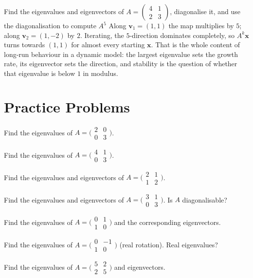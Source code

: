 \begin{worked}{Find the eigenvalues and eigenvectors of $A=\begin{pmatrix}4&1\\2&3\end{pmatrix}$, diagonalise it, and use the diagonalisation to compute $A^{5}$}
Along $\mathbf v_{1}=(1,1)$ the map multiplies by $5$; along
$\mathbf v_{2}=(1,-2)$ by $2$. Iterating, the $5$-direction dominates
completely, so $A^{k}\mathbf x$ turns towards $(1,1)$ for almost every
starting $\mathbf x$. That is the whole content of long-run behaviour in a
dynamic model: the largest eigenvalue sets the growth rate, its eigenvector
sets the direction, and stability is the question of whether that eigenvalue
is below $1$ in modulus.
\end{worked}

\section{Practice Problems}

\begin{problems}
  \item Find the eigenvalues of $A = \bigl(\begin{smallmatrix} 2 & 0 \\ 0 & 3 \end{smallmatrix}\bigr)$.
  \item Find the eigenvalues of $A = \bigl(\begin{smallmatrix} 4 & 1 \\ 0 & 3 \end{smallmatrix}\bigr)$.
  \item Find the eigenvalues and eigenvectors of $A = \bigl(\begin{smallmatrix} 2 & 1 \\ 1 & 2 \end{smallmatrix}\bigr)$.
  \item Find the eigenvalues and eigenvectors of $A = \bigl(\begin{smallmatrix} 3 & 1 \\ 0 & 3 \end{smallmatrix}\bigr)$. Is $A$ diagonalisable?
  \item Find the eigenvalues of $A = \bigl(\begin{smallmatrix} 0 & 1 \\ 1 & 0 \end{smallmatrix}\bigr)$ and the corresponding eigenvectors.
  \item Find the eigenvalues of $A = \bigl(\begin{smallmatrix} 0 & -1 \\ 1 & 0 \end{smallmatrix}\bigr)$ (real rotation). Real eigenvalues?
  \item Find the eigenvalues of $A = \bigl(\begin{smallmatrix} 5 & 2 \\ 2 & 5 \end{smallmatrix}\bigr)$ and eigenvectors.

\end{problems}
